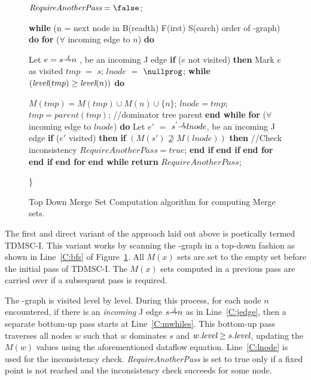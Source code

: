 {\begin{figure}[!ht]
\begin{minipage}[t]{5in}
\begin{code}
 $\textit{RequireAnotherPass}=\false$;

 {\bf while} (n = next node in B(readth) F(irst) S(earch) order of \DJ-graph) {\bf do} \label{C:bfs}
      {\bf for} ($\forall$ incoming edge to $n$) {\bf do} \label{C:jedge}

          Let $e = s \st{J} n$ , be an incoming J edge
          {\bf if} ($e$ not visited) {\bf then}
              Mark $e$ as visited 
              $\textit{tmp}$ $=$ $s$;
              $\textit{lnode}$ $=$ $\nullprog$;
              {\bf while} $(\textit{level}(tmp)\ge \textit{level}(n))$ {\bf do} \label{C:mwhiles}

                   $M(tmp)=M(tmp)\cup M(n)\cup \{n\}$;
                   $lnode=tmp$;
                   $tmp=parent(tmp)$; //dominator tree parent
              {\bf end while} \label{C:mwhilee}
              {\bf for} ($\forall$ incoming edge to $lnode$) {\bf do} \label{C:lnode}
                  Let $e'$ $=$ $s^{'} \st{J} lnode$, be an incoming J edge
                  {\bf if} ($e'$ visited) {\bf then}
                     {\bf if} $(M(s') \not\supseteq M(lnode))$ {\bf then} //Check inconsistency
                         $RequireAnotherPass = true$;
                     {\bf end if}
                  {\bf end if}
              {\bf end for}
          {\bf end if}
     {\bf end for}
 {\bf end while}
 {\bf return} $RequireAnotherPass$;
\end{code}
\}
\end{minipage}
\caption{Top Down Merge Set Computation algorithm for computing Merge sets.}
\label{F:tdmsc}
\end{figure} 

The first and direct variant of the approach laid out above is poetically 
termed TDMSC-I. This variant works by scanning the \DJ-graph in a top-down 
fashion as shown in Line~\ref{C:bfs} of Figure~\ref{F:tdmsc}. All $M(x)$ sets 
are set to the empty set before the initial pass of TDMSC-I. The $M(x)$ sets 
computed in a previous pass are carried over if a subsequent pass is required. 

The \DJ-graph is visited
level by level. During this process, for each node $n$ encountered, if there is 
an \emph{incoming}
J edge $s \st{J} n$ as in Line~\ref{C:jedge}, then a separate bottom-up pass starts at 
Line~\ref{C:mwhiles}. This bottom-up pass traverses all nodes $w$ such that $w$ 
dominates $s$ and $w.\textit{level} \geq s.\textit{level}$,
updating the $M(w)$ values using the aforementioned dataflow equation. Line~\ref{C:lnode} is used for
the inconsistency check. \textit{RequireAnotherPass} is set to true only if a fixed point is not reached
and the inconsistency check succeeds for some node.

}
